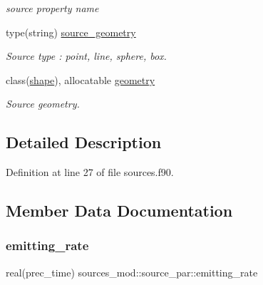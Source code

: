 \begin{DoxyCompactItemize}
\begin{DoxyCompactList}\small\item\em source property name \end{DoxyCompactList}\item 
type(string) \mbox{\hyperlink{structsources__mod_1_1source__par_a66e7627f128290f25c2c9eb36808eb5b}{source\+\_\+geometry}}
\begin{DoxyCompactList}\small\item\em Source type \+: \textquotesingle{}point\textquotesingle{}, \textquotesingle{}line\textquotesingle{}, \textquotesingle{}sphere\textquotesingle{}, \textquotesingle{}box\textquotesingle{}. \end{DoxyCompactList}\item 
class(\mbox{\hyperlink{structgeometry__mod_1_1shape}{shape}}), allocatable \mbox{\hyperlink{structsources__mod_1_1source__par_abf09d59fd65f02d1a8139e2f9f477207}{geometry}}
\begin{DoxyCompactList}\small\item\em Source geometry. \end{DoxyCompactList}\end{DoxyCompactItemize}


\subsection{Detailed Description}


Definition at line 27 of file sources.\+f90.



\subsection{Member Data Documentation}
\mbox{\label{structsources__mod_1_1source__par_af5e6a5cc49766a9fb90fedadebb64b87}} 
\subsubsection{\texorpdfstring{emitting\+\_\+rate}{emitting\_rate}}
{\footnotesize\ttfamily real(prec\+\_\+time) sources\+\_\+mod\+::source\+\_\+par\+::emitting\+\_\+rate\hspace{0.3cm}{\ttfamily [private]}}




